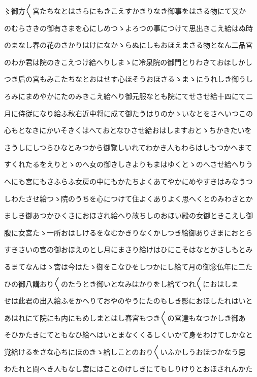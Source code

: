 \documentclass[a4paper,11pt,landscape]{ltjtarticle}
\begin{document}
〻御方〱宮たちなとはさらにもきこえすかきりなき御事をはさる物にて又か
\par\medskip
のむらさきの御有さまを心にしめつゝよろつの事につけて思出きこえ給はぬ時
\par\medskip
のまなし春の花のさかりはけになかゝらぬにしもおほえまさる物となん二品宮
\par\medskip
のわか君は院のきこえつけ給へりしまゝに冷泉院の御門とりわきておほしかし
\par\medskip
つき后の宮もみこたちなとおはせす心ほそうおほさるゝまゝにうれしき御うし
\par\medskip
ろみにまめやかにたのみきこえ給へり御元服なとも院にてせさせ給十四にて二
\par\medskip
月に侍従になり給ふ秋右近中将に成て御たうはりのかゝいなとをさへいつこの
\par\medskip
心もとなきにかいそきくはへておとなひさせ給おはしますおとゝちかきたいを
\par\medskip
さうしにしつらひなとみつから御覧しいれてわかき人もわらはしもつかへまて
\par\medskip
すくれたるをえりとゝのへ女の御きしきよりもまはゆくとゝのへさせ給へりう
\par\medskip
へにも宮にもさふらふ女房の中にもかたちよくあてやかにめやすきはみなうつ
\par\medskip
しわたさせ給つゝ院のうちを心につけて住よくありよく思へくとのみわさとか
\par\medskip
ましき御あつかひくさにおほされ給へり故ちしのおほい殿の女御ときこえし御
\par\medskip
腹に女宮たゝ一所おはしけるをなむかきりなくかしつき給御ありさまにおとら
\par\medskip
すきさいの宮の御おほえのとし月にまさり給けはひにこそはなとかさしもとみ
\par\medskip
るまてなんはゝ宮は今はたゝ御をこなひをしつかにし給て月の御念仏年に二た
\par\medskip
ひの御八講おり〱のたうとき御いとなみはかりをし給てつれ〱におはしま
\par\medskip
せは此君の出入給ふをかへりておやのやうにたのもしき影におほしたれはいと
\par\medskip
あはれにて院にも内にもめしまとはし春宮もつき〱の宮達もなつかしき御あ
\par\medskip
そひかたきにてともなひ給へはいとまなくくるしくいかて身をわけてしかなと
\par\medskip
覚給けるをさな心ちにほのきゝ給しことのおり〱いふかしうおほつかなう思
\par\medskip
わたれと問へき人もなし宮にはことのけしきにてもしりけりとおほされんかた
\end{document}
